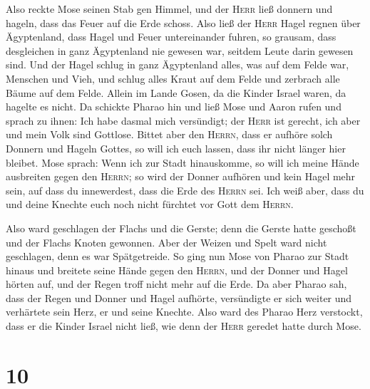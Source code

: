  Also reckte Mose seinen Stab gen Himmel, und der
\textsc{Herr} ließ donnern und hageln, dass das Feuer auf die Erde
schoss. Also ließ der \textsc{Herr} Hagel regnen über Ägyptenland,
 dass Hagel und Feuer untereinander fuhren, so grausam,
dass desgleichen in ganz Ägyptenland nie gewesen war, seitdem Leute
darin gewesen sind.  Und der Hagel schlug in ganz
Ägyptenland alles, was auf dem Felde war, Menschen und Vieh, und schlug
alles Kraut auf dem Felde und zerbrach alle Bäume auf dem Felde.
 Allein im Lande Gosen, da die Kinder Israel waren, da
hagelte es nicht.  Da schickte Pharao hin und ließ Mose
und Aaron rufen und sprach zu ihnen: Ich habe dasmal mich versündigt;
der \textsc{Herr} ist gerecht, ich aber und mein Volk sind Gottlose.
 Bittet aber den \textsc{Herrn}, dass er aufhöre solch
Donnern und Hageln Gottes, so will ich euch lassen, dass ihr nicht
länger hier bleibet.  Mose sprach: Wenn ich zur Stadt
hinauskomme, so will ich meine Hände ausbreiten gegen den
\textsc{Herrn}; so wird der Donner aufhören und kein Hagel mehr sein,
auf dass du innewerdest, dass die Erde des \textsc{Herrn} sei.
 Ich weiß aber, dass du und deine Knechte euch noch nicht
fürchtet vor Gott dem \textsc{Herrn}.

 Also ward geschlagen der Flachs und die Gerste; denn die
Gerste hatte geschoßt und der Flachs Knoten gewonnen. 
Aber der Weizen und Spelt ward nicht geschlagen, denn es war
Spätgetreide.  So ging nun Mose von Pharao zur Stadt
hinaus und breitete seine Hände gegen den \textsc{Herrn}, und der Donner
und Hagel hörten auf, und der Regen troff nicht mehr auf die Erde.
 Da aber Pharao sah, dass der Regen und Donner und Hagel
aufhörte, versündigte er sich weiter und verhärtete sein Herz, er und
seine Knechte.  Also ward des Pharao Herz verstockt, dass
er die Kinder Israel nicht ließ, wie denn der \textsc{Herr} geredet
hatte durch Mose.

\hypertarget{section-9}{%
\section{10}\label{section-9}}

